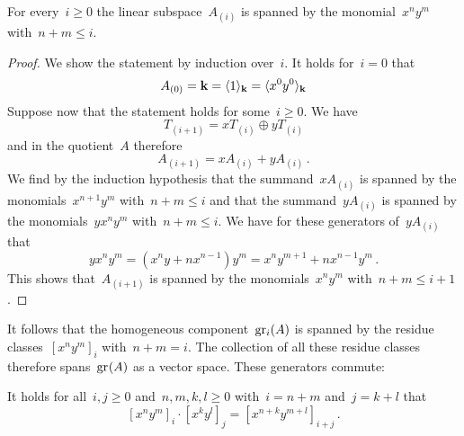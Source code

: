 \begin{example}
  \begin{claim}
    \label{subspace spanned by monomials}
    For every~$i \geq 0$ the linear subspace~$A_{(i)}$ is spanned by the monomial~$x^n y^m$ with~$n + m \leq i$.
  \end{claim}
  
  \begin{proof}
    We show the statement by induction over~$i$.
    It holds for~$i = 0$ that
    \[
      A_{(0)}
      =
      \mathbf{k}
      =
      \langle1\rangle_{\mathbf{k}}
      =
      \langle x^0 y^0\rangle_{\mathbf{k}}
    \]
    Suppose now that the statement holds for some~$i \geq 0$.
    We have
    \[
      T_{(i+1)}
      =
      x T_{(i)} \oplus y T_{(i)}
    \]
    and in the quotient~$A$ therefore
    \[
      A_{(i+1)}
      =
      x A_{(i)} + y A_{(i)} \,.
    \]
    We find by the induction hypothesis that the summand~$x A_{(i)}$ is spanned by the monomials~$x^{n+1} y^m$ with~$n+m \leq i$ and that the summand~$y A_{(i)}$ is spanned by the monomials~$y x^n y^m$ with~$n + m \leq i$.
    We have for these generators of~$y A_{(i)}$ that
    \[
      y x^n y^m
      =
      (x^n y + n x^{n-1}) y^m
      =
      x^n y^{m+1} + n x^{n-1} y^m \,.
    \]
    This shows that~$A_{(i+1)}$ is spanned by the monomials~$x^n y^m$ with~$n+m \leq i+1$.
  \end{proof}
  
  It follows that the homogeneous component~$\gr[i](A)$ is spanned by the residue classes~$[x^n y^m]_i$ with~$n + m = i$.
  The collection of all these residue classes therefore spans~$\gr(A)$ as a vector space.
  These generators commute:
  
  \begin{claim}
    It holds for all~$i, j \geq 0$ and~$n, m, k, l \geq 0$ with~$i = n+m$ and~$j = k+l$ that
    \[
      [x^n y^m]_i \cdot [x^k y^l]_j
      =
      [x^{n+k} y^{m+l}]_{i+j} \,.
    \]
  \end{claim}
  

\end{example}
